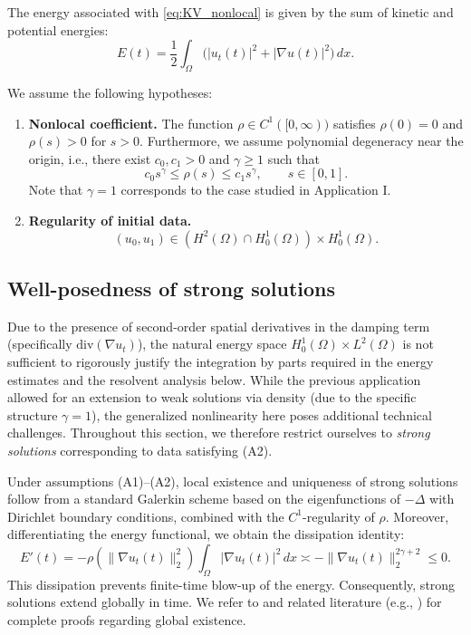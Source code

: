 \documentclass[11pt,reqno]{amsart}
\theoremstyle{remark}
\begin{document}
The energy associated with \eqref{eq:KV_nonlocal} is given by the sum of kinetic and potential energies:
\[
E(t)=\frac12\int_\Omega\big(|u_t(t)|^2+|\nabla u(t)|^2\big)\,dx.
\]

We assume the following hypotheses:
\begin{enumerate}
\item[(A1)] \textbf{Nonlocal coefficient.}
The function $\rho\in C^1([0,\infty))$ satisfies $\rho(0)=0$ and $\rho(s)>0$ for $s>0$. Furthermore, we assume polynomial degeneracy near the origin, i.e., there exist
$c_0,c_1>0$ and $\gamma\ge 1$ such that
\begin{equation}\label{cond:rho_KV}
c_0 s^\gamma \le \rho(s) \le c_1 s^\gamma,
\qquad s\in[0,1].
\end{equation}
Note that $\gamma=1$ corresponds to the case studied in Application I.

\item[(A2)] \textbf{Regularity of initial data.}
\[
(u_0,u_1)\in (H^2(\Omega)\cap H_0^1(\Omega))\times H_0^1(\Omega).
\]
\end{enumerate}

\subsection{Well-posedness of strong solutions}
\label{subsec:KV_nonlocal_wp}

Due to the presence of second-order spatial derivatives in the damping term (specifically $\text{div}(\nabla u_t)$),
the natural energy space $H_0^1(\Omega)\times L^2(\Omega)$ is not sufficient to
rigorously justify the integration by parts required in the energy estimates and the resolvent analysis below.
While the previous application allowed for an extension to weak solutions via density (due to the specific structure $\gamma=1$), the generalized nonlinearity here poses additional technical challenges.
Throughout this section, we therefore restrict ourselves to \emph{strong solutions}
corresponding to data satisfying \textup{(A2)}.

Under assumptions \textup{(A1)}--\textup{(A2)}, local existence and uniqueness of
strong solutions follow from a standard Galerkin scheme based on the eigenfunctions of
$-\Delta$ with Dirichlet boundary conditions, combined with the $C^1$-regularity
of $\rho$.
Moreover, differentiating the energy functional, we obtain the dissipation identity:
\begin{equation}\label{eq:KV_nonlocal_dissip}
E'(t)=-\rho(\|\nabla u_t(t)\|_2^2)\int_\Omega|\nabla u_t(t)|^2\,dx \asymp -\|\nabla u_t(t)\|_2^{2\gamma+2} \le 0.
\end{equation}
This dissipation prevents finite-time blow-up of the energy.
Consequently, strong solutions extend globally in time.
We refer to \cite{Cavalcanti2025} and related literature (e.g., \cite{SICON2003}) for complete proofs regarding global existence.
\end{document}
